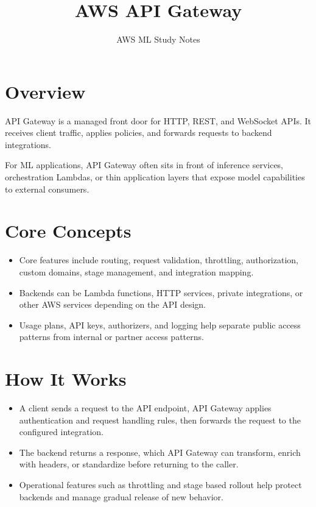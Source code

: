 \documentclass[10pt,twocolumn]{article}
\begin{document}
\title{\vspace{-1.6cm}AWS API Gateway}
\author{AWS ML Study Notes}
\date{}
\maketitle
\small

\section*{Overview}
API Gateway is a managed front door for HTTP, REST, and WebSocket APIs. It receives client traffic, applies policies, and forwards requests to backend integrations.

For ML applications, API Gateway often sits in front of inference services, orchestration Lambdas, or thin application layers that expose model capabilities to external consumers.

\section*{Core Concepts}
\begin{itemize}
\item Core features include routing, request validation, throttling, authorization, custom domains, stage management, and integration mapping.
\item Backends can be Lambda functions, HTTP services, private integrations, or other AWS services depending on the API design.
\item Usage plans, API keys, authorizers, and logging help separate public access patterns from internal or partner access patterns.
\end{itemize}

\section*{How It Works}
\begin{itemize}
\item A client sends a request to the API endpoint, API Gateway applies authentication and request handling rules, then forwards the request to the configured integration.
\item The backend returns a response, which API Gateway can transform, enrich with headers, or standardize before returning to the caller.
\item Operational features such as throttling and stage based rollout help protect backends and manage gradual release of new behavior.
\end{itemize}
\end{document}
